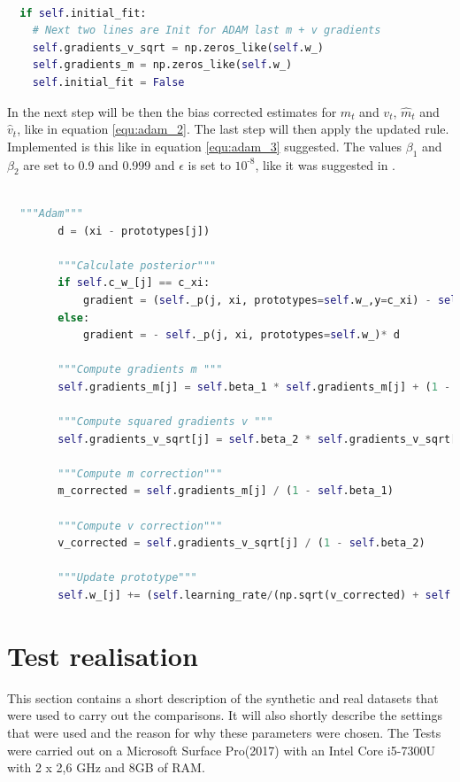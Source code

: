 \documentclass[12pt,oneside,a4paper,parskip]{scrbook}
\begin{document}
\begin{lstlisting}[label=lst:adam,
  language=python,
  firstnumber=1,
  caption= Modification of the \texttt{\_optimize} method to initialize $m_t$ and $v_t$.]			   

  if self.initial_fit:
    # Next two lines are Init for ADAM last m + v gradients
    self.gradients_v_sqrt = np.zeros_like(self.w_)
    self.gradients_m = np.zeros_like(self.w_)
    self.initial_fit = False
\end{lstlisting}

In the next step will be then the bias corrected estimates for $m_t$ and $v_t$, $\hat{m}_t$ and $\hat{v}_t$,
like in equation \ref{equ:adam_2}. 
The last step will then apply the updated rule. Implemented is this like in equation \ref{equ:adam_3} suggested.
The values $\beta_1$ and $\beta_2$ are set to 0.9 and 0.999 and $\epsilon$ is set to $10^\textit{-8}$, like it was suggested in \cite{overvieDiffRSLVQ, Kingma2014AdamAM}.

\pagebreak

\begin{lstlisting}[label=lst:adam,
  language=python,
  firstnumber=1,
  caption= Implementation of Adam on basis of \cite{PassiveDriftonRSLVQ}.]			   

  """Adam"""
        d = (xi - prototypes[j])

        """Calculate posterior"""
        if self.c_w_[j] == c_xi:
            gradient = (self._p(j, xi, prototypes=self.w_,y=c_xi) - self._p(j, xi, prototypes=self.w_))* d
        else:
            gradient = - self._p(j, xi, prototypes=self.w_)* d

        """Compute gradients m """
        self.gradients_m[j] = self.beta_1 * self.gradients_m[j] + (1 - self.beta_1) * gradient

        """Compute squared gradients v """
        self.gradients_v_sqrt[j] = self.beta_2 * self.gradients_v_sqrt[j] + (1 - self.beta_2) * gradient ** 2 

        """Compute m correction"""
        m_corrected = self.gradients_m[j] / (1 - self.beta_1)

        """Compute v correction"""
        v_corrected = self.gradients_v_sqrt[j] / (1 - self.beta_2)

        """Update prototype"""
        self.w_[j] += (self.learning_rate/(np.sqrt(v_corrected) + self.epsilon ))*m_corrected
\end{lstlisting}

\chapter{Test realisation}
This section contains a short description of the synthetic and real datasets that were used to carry out the comparisons.
It will also shortly describe the settings that were used and the reason for why these parameters were chosen.
The Tests were carried out on a Microsoft Surface Pro(2017) with an Intel Core i5-7300U with 2 x 2,6 GHz and 8GB of RAM.
\end{document}
